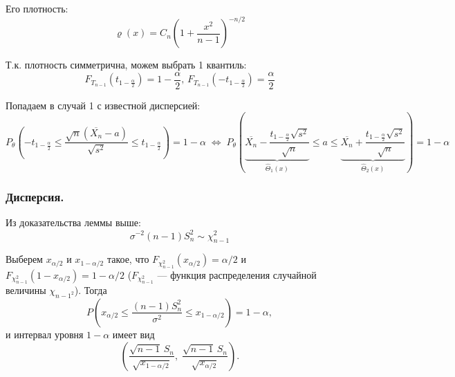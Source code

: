 \begin{enumerate}
	Его плотность:
	\[ \varrho(x) = C_n \left( 1 + \frac{x^2}{n-1} \right)^{-n/2} \]
 	
	Т.к. плотность симметрична, можем выбрать 1 квантиль:
	\[ F_{T_{n-1}}(t_{1 - \frac{\alpha}2}) = 1 - \frac{\alpha}2, \, F_{T_{n-1}}(-t_{1 - \frac{\alpha}2}) = \frac{\alpha}2 \]
	
	Попадаем в случай 1 с известной дисперсией:
	\[ P_{\theta} \left( -t_{1 - \frac{\alpha}2} \le \frac{\sqrt{n}(\overline{X_n} - a)}{\sqrt{s^2}} \le t_{1 - \frac{\alpha}2} \right) = 
	1 - \alpha \;\Leftrightarrow\; 
	P_{\theta} \left( \underset{\hat\Theta_1(x)}{\underbrace{\overline{X_n} - \frac{t_{1 - \frac{\alpha}2} \sqrt{s^2}}{\sqrt{n}}}} \le a \le 
	\underset{\hat\Theta_2(x)}{\underbrace{\overline{X_n} + \frac{t_{1 - \frac{\alpha}2} \sqrt{s^2}}{\sqrt{n}}}} \right) = 1 - \alpha \]
\end{enumerate}

\subsubsection{Дисперсия.}

Из доказательства леммы выше:
\[ \sigma^{-2}(n - 1) S_n^2 \sim \chi_{n-1}^2 \]

Выберем $x_{\alpha/2}$ и $x_{1-\alpha/2}$ такое, что $F_{\chi_{n-1}^2}(x_{\alpha/2}) = \alpha/2$ и $F_{\chi_{n-1}^2}(1-x_{\alpha/2}) = 1-\alpha/2$ ($F_{\chi_{n-1}^2}$ --- функция распределения случайной величины $\chi_{n-1^2}$). Тогда
\[ P \left( x_{\alpha/2} \le \frac{(n-1) S_n^2}{\sigma^2} \le x_{1-\alpha/2} \right) = 1 - \alpha, \]
и интервал уровня $1 - \alpha$ имеет вид 
\[ \left( \frac{\sqrt{n-1}\,S_n}{\sqrt{x_{1-\alpha/2}}}, \; \frac{\sqrt{n-1}\,S_n}{\sqrt{x_{\alpha/2}}} \right). \] 
